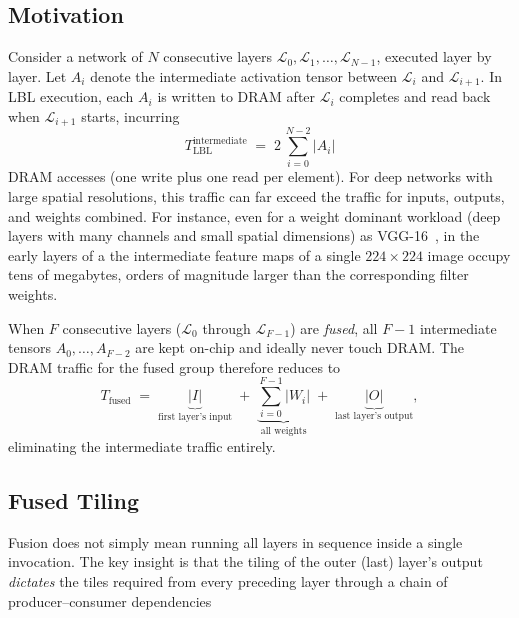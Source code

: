 \subsection{Motivation}
\label{sec:fusion-motivation}

Consider a network of $N$ consecutive layers
$\mathcal{L}_0, \mathcal{L}_1, \dots, \mathcal{L}_{N-1}$, executed layer by
layer.  Let $A_i$ denote the intermediate activation tensor between
$\mathcal{L}_i$ and $\mathcal{L}_{i+1}$.
In LBL execution, each $A_i$ is written to DRAM after
$\mathcal{L}_i$ completes and read back when $\mathcal{L}_{i+1}$
starts, incurring
\begin{equation}
\label{eq:lbl-traffic}
T_{\text{LBL}}^{\text{intermediate}}
  \;=\; 2\,\sum_{i=0}^{N-2} |A_i|
\end{equation}
DRAM accesses (one write plus one read per element).  For deep networks with
large spatial resolutions, this traffic can far exceed the traffic for inputs,
outputs, and weights combined.  For instance, even for a weight dominant workload (deep layers with
        many channels and small spatial dimensions) as VGG-16~\cite{vgg16},  in the early layers of a the intermediate feature maps of a single
$224\!\times\!224$ image occupy tens of megabytes, orders of magnitude
larger than the corresponding filter weights.

When $F$ consecutive layers ($\mathcal{L}_0$ through
$\mathcal{L}_{F-1}$) are \emph{fused}, all $F-1$ intermediate tensors
$A_0, \dots, A_{F-2}$ are kept on-chip and ideally never touch DRAM.
The DRAM traffic for the fused group therefore reduces to
\begin{equation}
\label{eq:fused-traffic}
T_{\text{fused}}
  \;=\; \underbrace{|I|}_{\text{first layer's input}}
  \;+\; \underbrace{\sum_{i=0}^{F-1}|W_i|}_{\text{all weights}}
  \;+\; \underbrace{|O|}_{\text{last layer's output}},
\end{equation}
eliminating the intermediate traffic entirely.

\subsection{Fused Tiling}
\label{sec:fused-tiling}

Fusion does not simply mean running all layers in sequence inside a
single invocation.
The key insight is that the tiling of the outer (last) layer's output
\emph{dictates} the tiles required from every preceding layer through
a chain of producer--consumer dependencies 

